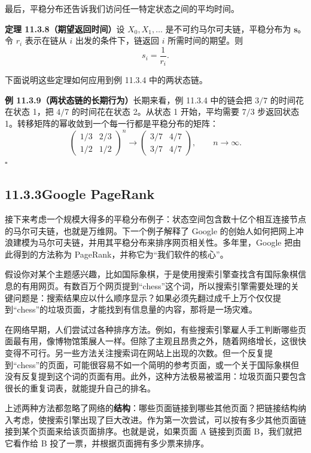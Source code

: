 \documentclass[UTF8, 12pt, fontset=fandol, oneside]{ctexart}
\begin{document}
最后，平稳分布还告诉我们访问任一特定状态之间的平均时间。

\noindent\textbf{定理 11.3.8（期望返回时间）}\quad 设 $X_0,X_1,\ldots$ 是不可约马尔可夫链，平稳分布为 $\mathbf s$。令 $r_i$ 表示在链从 $i$ 出发的条件下，链返回 $i$ 所需时间的期望。则
\[
  s_i=\frac{1}{r_i}.
\]

下面说明这些定理如何应用到例 11.3.4 中的两状态链。

\noindent\textbf{例 11.3.9（两状态链的长期行为）}\quad 长期来看，例 11.3.4 中的链会把 $3/7$ 的时间花在状态 1，把 $4/7$ 的时间花在状态 2。从状态 1 开始，平均需要 $7/3$ 步返回状态 1。转移矩阵的幂收敛到一个每一行都是平稳分布的矩阵：
\[
  \begin{pmatrix}
    1/3 & 2/3\\
    1/2 & 1/2
  \end{pmatrix}^n
  \to
  \begin{pmatrix}
    3/7 & 4/7\\
    3/7 & 4/7
  \end{pmatrix},
  \qquad n\to\infty.
\]
$\square$

\subsection*{11.3.3\quad Google PageRank}

接下来考虑一个规模大得多的平稳分布例子：状态空间包含数十亿个相互连接节点的马尔可夫链，也就是万维网。下一个例子解释了 Google 的创始人如何把网上冲浪建模为马尔可夫链，并用其平稳分布来排序网页相关性。多年里，Google 把由此得到的方法称为 PageRank，并称它为“我们软件的核心”。

假设你对某个主题感兴趣，比如国际象棋，于是使用搜索引擎查找含有国际象棋信息的有用网页。有数百万个网页提到“chess”这个词，所以搜索引擎需要处理的关键问题是：搜索结果应以什么顺序显示？如果必须先翻过成千上万个仅仅提到“chess”的垃圾页面，才能找到有信息量的内容，那将是一场灾难。

在网络早期，人们尝试过各种排序方法。例如，有些搜索引擎雇人手工判断哪些页面最有用，像博物馆策展人一样。但除了主观且昂贵之外，随着网络增长，这很快变得不可行。另一些方法关注搜索词在网站上出现的次数。但一个反复提到“chess”的页面，可能很容易不如一个简明的参考页面，或一个关于国际象棋但没有反复提到这个词的页面有用。此外，这种方法极易被滥用：垃圾页面只要包含很长的重复词表，就能提升自己的排名。

上述两种方法都忽略了网络的\textbf{结构}：哪些页面链接到哪些其他页面？把链接结构纳入考虑，使搜索引擎出现了巨大改进。作为第一次尝试，可以按有多少其他页面链接到某个页面来给该页面排序。也就是说，如果页面 A 链接到页面 B，我们就把它看作给 B 投了一票，并根据页面拥有多少票来排序。
\end{document}
